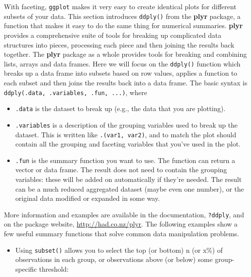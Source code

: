 With faceting, \texttt{ggplot} makes it very easy to create identical
plots for different subsets of your data.  This
section introduces \texttt{ddply()} from the \textbf{plyr} package, a
function that makes it easy to do the same thing for numerical
summaries. \textbf{plyr} provides a comprehensive suite of tools for
breaking up complicated data structures into pieces, processing each
piece and then joining the results back together. The \textbf{plyr}
package as a whole provides tools for breaking and combining lists,
arrays and data frames. Here we will focus on the \texttt{ddply()}
function which breaks up a data frame into subsets based on row values,
applies a function to each subset and then joins the results back into a
data frame. The basic syntax is
\texttt{ddply(.data, .variables, .fun, ...)}, where 

\begin{itemize}
\itemsep1pt\parskip0pt
\item
  \texttt{.data} is the dataset to break up (e.g., the data that you are
  plotting).
\item
  \texttt{.variables} is a description of the grouping variables used to
  break up the dataset. This is written like \texttt{.(var1, var2)}, and
  to match the plot should contain all the grouping and faceting
  variables that you've used in the plot.
\item
  \texttt{.fun} is the summary function you want to use. The function
  can return a vector or data frame. The result does not need to contain
  the grouping variables: these will be added on automatically if
  they're needed. The result can be a much reduced aggregated dataset
  (maybe even one number), or the original data modified or expanded in
  some way.
\end{itemize}

More information and examples are available in the documentation,
\texttt{?ddply}, and on the package website,
\url{http://had.co.nz/plyr}. The following examples show a few useful
summary functions that solve common data manipulation problems.

\begin{itemize}
\itemsep1pt\parskip0pt
\item
  Using \texttt{subset()} allows you to select the top (or bottom) n (or
  x\%) of observations in each group, or observations above (or below)
  some group-specific threshold: 
\end{itemize}

